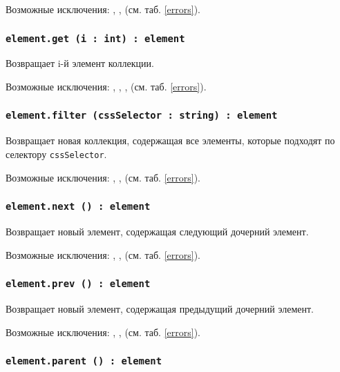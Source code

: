 Возможные исключения: , ,  (см. таб. \ref{errors}).

\subsubsection{\texttt{element.get (i : int) : element}}

Возвращает i-й элемент коллекции.

Возможные исключения: , , ,  (см. таб. \ref{errors}).

\subsubsection{\texttt{element.filter (cssSelector : string) : element}}

Возвращает новая коллекция, содержащая все элементы, которые подходят по селектору \texttt{cssSelector}.

Возможные исключения: , ,  (см. таб. \ref{errors}).

\subsubsection{\texttt{element.next () : element}}

Возвращает новый элемент, содержащая следующий дочерний элемент.

Возможные исключения: , ,  (см. таб. \ref{errors}).

\subsubsection{\texttt{element.prev () : element}}

Возвращает новый элемент, содержащая предыдущий дочерний элемент.

Возможные исключения: , ,  (см. таб. \ref{errors}).

\subsubsection{\texttt{element.parent () : element}}

